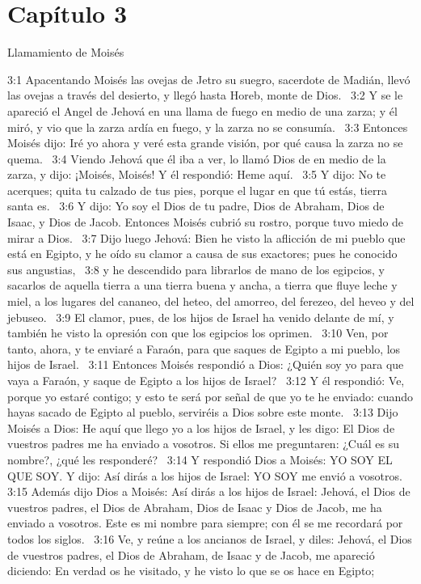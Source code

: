 \section*{Capítulo 3}
Llamamiento de Moisés 

3:1 Apacentando Moisés las ovejas de Jetro su suegro, sacerdote de Madián, llevó las ovejas a través del desierto, y llegó hasta Horeb, monte de Dios.  
3:2 Y se le apareció el Angel de Jehová en una llama de fuego en medio de una zarza; y él miró, y vio que la zarza ardía en fuego, y la zarza no se consumía.  
3:3 Entonces Moisés dijo: Iré yo ahora y veré esta grande visión, por qué causa la zarza no se quema.  
3:4 Viendo Jehová que él iba a ver, lo llamó Dios de en medio de la zarza, y dijo: ¡Moisés, Moisés! Y él respondió: Heme aquí.  
3:5 Y dijo: No te acerques; quita tu calzado de tus pies, porque el lugar en que tú estás, tierra santa es.  
3:6 Y dijo: Yo soy el Dios de tu padre, Dios de Abraham, Dios de Isaac, y Dios de Jacob. Entonces Moisés cubrió su rostro, porque tuvo miedo de mirar a Dios.  
3:7 Dijo luego Jehová: Bien he visto la aflicción de mi pueblo que está en Egipto, y he oído su clamor a causa de sus exactores; pues he conocido sus angustias,  
3:8 y he descendido para librarlos de mano de los egipcios, y sacarlos de aquella tierra a una tierra buena y ancha, a tierra que fluye leche y miel, a los lugares del cananeo, del heteo, del amorreo, del ferezeo, del heveo y del jebuseo.  
3:9 El clamor, pues, de los hijos de Israel ha venido delante de mí, y también he visto la opresión con que los egipcios los oprimen.  
3:10 Ven, por tanto, ahora, y te enviaré a Faraón, para que saques de Egipto a mi pueblo, los hijos de Israel.  
3:11 Entonces Moisés respondió a Dios: ¿Quién soy yo para que vaya a Faraón, y saque de Egipto a los hijos de Israel?  
3:12 Y él respondió: Ve, porque yo estaré contigo; y esto te será por señal de que yo te he enviado: cuando hayas sacado de Egipto al pueblo, serviréis a Dios sobre este monte.  
3:13 Dijo Moisés a Dios: He aquí que llego yo a los hijos de Israel, y les digo: El Dios de vuestros padres me ha enviado a vosotros. Si ellos me preguntaren: ¿Cuál es su nombre?, ¿qué les responderé?  
3:14 Y respondió Dios a Moisés: YO SOY EL QUE SOY. Y dijo: Así dirás a los hijos de Israel: YO SOY me envió a vosotros.  
3:15 Además dijo Dios a Moisés: Así dirás a los hijos de Israel: Jehová, el Dios de vuestros padres, el Dios de Abraham, Dios de Isaac y Dios de Jacob, me ha enviado a vosotros. Este es mi nombre para siempre; con él se me recordará por todos los siglos.  
3:16 Ve, y reúne a los ancianos de Israel, y diles: Jehová, el Dios de vuestros padres, el Dios de Abraham, de Isaac y de Jacob, me apareció diciendo: En verdad os he visitado, y he visto lo que se os hace en Egipto;  
